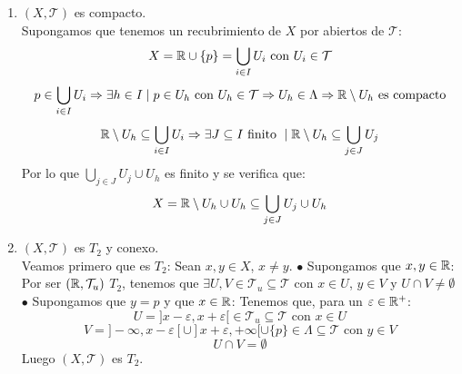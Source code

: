 \documentclass[12pt]{article}
\begin{document}
\begin{ejercicio}[3 puntos]
\begin{enumerate}[label=(\alph*)]
            \item $(X,\mathcal{T})$ es compacto.\\

                \noindent
                Supongamos que tenemos un recubrimiento de $X$ por abiertos de $\mathcal{T}$:
                $$X = \mathbb{R} \cup \{p\} = \bigcup_{i \in I} U_i \mbox{ con } U_i \in \mathcal{T}$$
                $$p \in \bigcup_{i \in I} U_i \Rightarrow \exists h \in I \mid p \in U_h \mbox{ con } U_h \in \mathcal{T} \Rightarrow U_h \in \Lambda \Rightarrow \mathbb{R}\setminus U_h \mbox{ es compacto}$$
                $$\mathbb{R}\setminus U_h \subseteq \bigcup_{i \in I}U_i \Rightarrow \exists J \subseteq I \mbox{ finito } \mid \mathbb{R}\setminus U_h \subseteq \bigcup_{j \in J} U_j$$
                Por lo que $\displaystyle \bigcup_{j \in J}U_j\cup U_h$ es finito y se verifica que:
                $$X = \mathbb{R}\setminus U_h \cup U_h \subseteq \bigcup_{j \in J}U_j\cup U_h$$

            \item $(X,\mathcal{T})$ es $T_2$ y conexo.\\

                \noindent
                Veamos primero que es $T_2$:\newline
                Sean $x,y \in X$, $x \neq y$.\newline
                $\bullet$ Supongamos que $x, y \in \mathbb{R}$:\newline
                Por ser $(\mathbb{R}, \mathcal{T}_u)$ $T_2$, tenemos que $\exists U, V \in \mathcal{T}_u \subseteq \mathcal{T}$ con $x \in U$, $y \in V$ y $U\cap V \neq \emptyset$
                $\bullet$ Supongamos que $y = p$ y que $x \in \mathbb{R}$:\newline
                Tenemos que, para un $\varepsilon \in \mathbb{R}^{+}$:
                $$U = ]x-\varepsilon, x+\varepsilon[ \in \mathcal{T}_u \subseteq \mathcal{T} \mbox{ con } x \in U$$
                $$V = ]-\infty, x-\varepsilon[ \cup ]x+\varepsilon, +\infty[ \cup \{p\} \in \Lambda \subseteq \mathcal{T} \mbox{ con } y \in V$$
                $$U \cap V = \emptyset$$
                Luego $(X, \mathcal{T})$ es $T_2$.\\


\end{enumerate}
\end{ejercicio}
\end{document}
